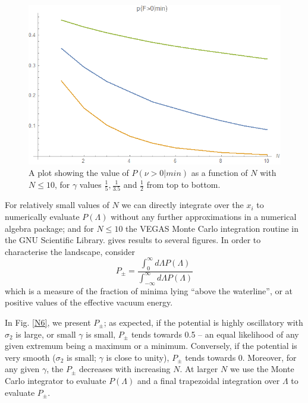 \documentclass[12pt]{article}
\begin{document}
\begin{figure}
  \centering
    \includegraphics[width=\linewidth]{PVaryingWithN.png}
  \caption{A plot showing the value of $P(\nu>0|min)$ as a function of $N$ with $N\le10$, for $\gamma$ values $\frac{1}{5}, \frac{1}{3.5}$ and $\frac{1}{2}$ from top to bottom.}
  \label{gamma}
\end{figure}


For relatively small values of $N$ we can directly integrate over the $x_i$ to numerically evaluate $P(\Lambda)$ without any further approximations in a numerical algebra package; and for $N\le10$ the VEGAS \cite{VEGAS} Monte Carlo integration routine in the GNU Scientific Library.\cite{GSL} gives results to several figures.   In order to characterise the landscape, consider 
%
\begin{equation} \label{Ppm}
P_\pm = \frac{\int_0^\infty d \Lambda P(\Lambda)} {\int_{-\infty}^\infty d \Lambda P(\Lambda)} 
\end{equation}
%
which is a measure of the fraction of minima lying ``above the waterline'', or at positive values of the effective vacuum energy. 

 In Fig. \ref{N6}, we present $P_\pm$; as expected, if the potential is highly oscillatory with $\sigma_2$ is large, or small $\gamma$ is small, $P_\pm$  tends towards 0.5 --  an equal likelihood of any given extremum being a maximum or a minimum. Conversely, if the potential is very smooth ($\sigma_2$ is small; $\gamma$ is close to unity), $P_\pm$  tends towards 0. Moreover, for any given $\gamma$, the $P_\pm$ decreases with increasing $N$.   At larger $N$ we use the Monte Carlo integrator to evaluate $P(\Lambda)$ and a final trapezoidal integration over $\Lambda$  to evaluate $P_\pm$. 
 
\end{document}
